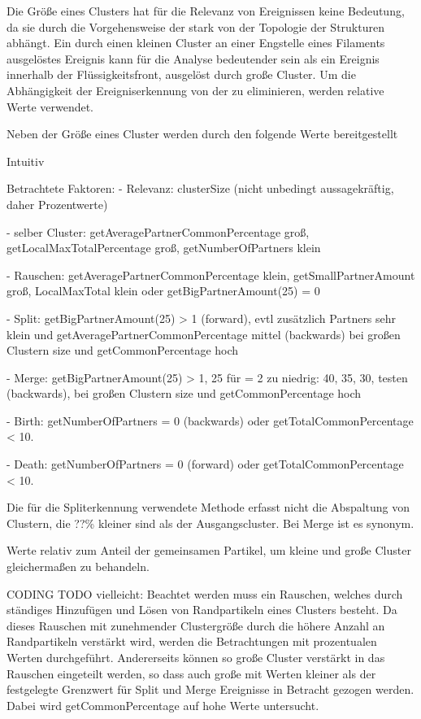 Die Größe eines Clusters hat für die Relevanz von Ereignissen keine Bedeutung, da sie durch die Vorgehensweise der \CFD stark von der Topologie der Strukturen abhängt. Ein durch einen kleinen Cluster an einer Engstelle eines Filaments ausgelöstes Ereignis kann für die Analyse bedeutender sein als ein Ereignis innerhalb der Flüssigkeitsfront, ausgelöst durch große Cluster. Um die Abhängigkeit der Ereigniserkennung von der  zu eliminieren, werden relative Werte verwendet. 

Neben der Größe eines Cluster werden durch den \SECC folgende Werte bereitgestellt

Intuitiv

Betrachtete Faktoren:
- Relevanz: clusterSize (nicht unbedingt aussagekräftig, daher Prozentwerte)

- selber Cluster: getAveragePartnerCommonPercentage groß, getLocalMaxTotalPercentage groß, getNumberOfPartners klein

- Rauschen: getAveragePartnerCommonPercentage klein, getSmallPartnerAmount groß, LocalMaxTotal klein oder  getBigPartnerAmount(25) = 0

- Split: getBigPartnerAmount(25) > 1 (forward), evtl zusätzlich Partners sehr klein und getAveragePartnerCommonPercentage mittel (backwards) bei großen Clustern size und getCommonPercentage hoch

- Merge: getBigPartnerAmount(25) > 1, 25 für = 2 zu niedrig: 40, 35, 30, testen (backwards), bei großen Clustern size und getCommonPercentage hoch

- Birth: getNumberOfPartners = 0 (backwards) oder getTotalCommonPercentage < 10.

- Death: getNumberOfPartners = 0 (forward) oder getTotalCommonPercentage < 10.

Die für die Spliterkennung verwendete Methode erfasst nicht die Abspaltung von Clustern, die ??\% kleiner sind als der Ausgangscluster. Bei Merge ist es synonym.

Werte relativ zum Anteil der gemeinsamen Partikel, um kleine und große Cluster gleichermaßen zu behandeln.

CODING TODO vielleicht:
Beachtet werden muss ein Rauschen, welches durch ständiges Hinzufügen und Lösen von Randpartikeln eines Clusters besteht. Da dieses Rauschen mit zunehmender Clustergröße durch die höhere Anzahl an Randpartikeln verstärkt wird, werden die Betrachtungen mit prozentualen Werten durchgeführt. Andererseits können so große Cluster verstärkt in das Rauschen eingeteilt werden, so dass auch große  mit Werten kleiner als der festgelegte Grenzwert für Split und Merge Ereignisse in Betracht gezogen werden. Dabei wird getCommonPercentage auf hohe Werte untersucht.




